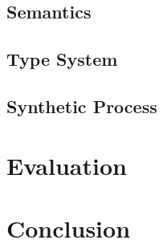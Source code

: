   \section{Semantics}
  \section{Type System}
  \section{Synthetic Process}

\chapter{Evaluation} %

\chapter{Conclusion} %



